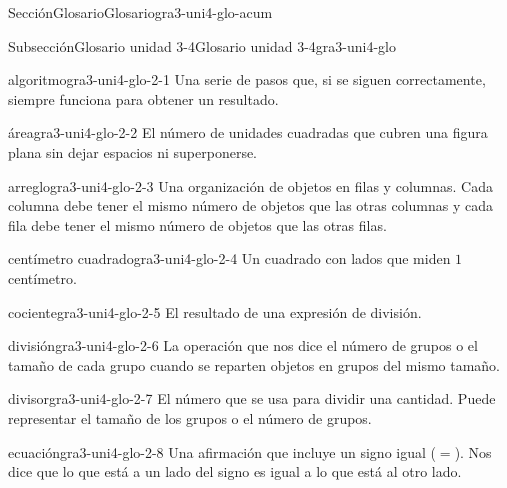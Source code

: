 \documentclass[twoside,14pt,]{extarticle}
\begin{document}
%
%
\typeout{************************************************}
\typeout{************************************************}
%
\begin{sectionptx}{Sección}{Glosario}{}{Glosario}{}{}{gra3-uni4-glo-acum}
%
%
\typeout{************************************************}
\typeout{************************************************}
%
\begin{subsectionptx}{Subsección}{Glosario unidad 3-4}{}{Glosario unidad 3-4}{}{}{gra3-uni4-glo}
%
\begin{descriptionlist}
\begin{dlimedium}{algoritmo}{gra3-uni4-glo-2-1}%
Una serie de pasos que, si se siguen correctamente, siempre funciona para obtener un resultado.%
\end{dlimedium}%
\begin{dlimedium}{área}{gra3-uni4-glo-2-2}%
El número de unidades cuadradas que cubren una figura plana sin dejar espacios ni superponerse.%
\end{dlimedium}%
\begin{dlimedium}{arreglo}{gra3-uni4-glo-2-3}%
Una organización de objetos en filas y columnas. Cada columna debe tener el mismo número de objetos que las otras columnas y cada fila debe tener el mismo número de objetos que las otras filas.%
\end{dlimedium}%
\begin{dlimedium}{centímetro cuadrado}{gra3-uni4-glo-2-4}%
Un cuadrado con lados que miden \(1\) centímetro.%
\end{dlimedium}%
\begin{dlimedium}{cociente}{gra3-uni4-glo-2-5}%
El resultado de una expresión de división.%
\end{dlimedium}%
\begin{dlimedium}{división}{gra3-uni4-glo-2-6}%
La operación que nos dice el número de grupos o el tamaño de cada grupo cuando se reparten objetos en grupos del mismo tamaño.%
\end{dlimedium}%
\begin{dlimedium}{divisor}{gra3-uni4-glo-2-7}%
El número que se usa para dividir una cantidad. Puede representar el tamaño de los grupos o el número de grupos.%
\end{dlimedium}%
\begin{dlimedium}{ecuación}{gra3-uni4-glo-2-8}%
Una afirmación que incluye un signo igual (\(=\)). Nos dice que lo que está a un lado del signo es igual a lo que está al otro lado.%

\end{dlimedium}
\end{descriptionlist}
\end{subsectionptx}
\end{sectionptx}
\end{document}
